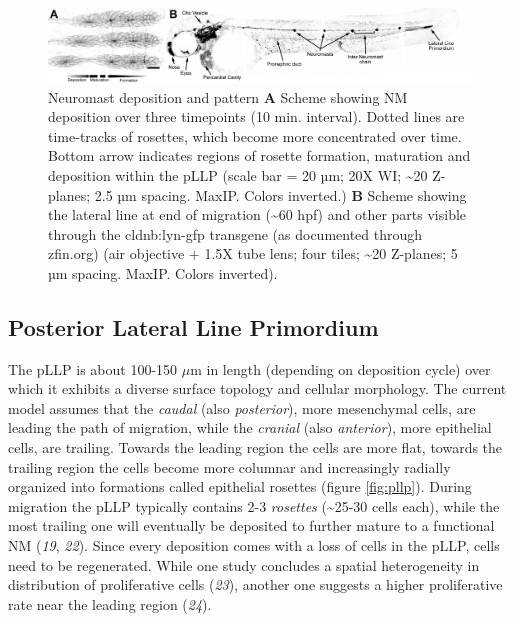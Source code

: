 \documentclass[11pt,singlespacinge,twoside]{reedthesis} %
\begin{document}
\begin{figure}

{\centering \includegraphics[width=.95\textwidth]{figures/intro/ll_gfp} 

}

\caption[Neuromast deposition and pattern]{Neuromast deposition and pattern \textbf{A} Scheme showing NM deposition over three timepoints (10 min. interval). Dotted lines are time-tracks of rosettes, which become more concentrated over time. Bottom arrow indicates regions of rosette formation, maturation and deposition within the pLLP (scale bar = 20 µm; 20X WI; \textasciitilde{}20 Z-planes; 2.5 µm spacing. MaxIP. Colors inverted.) \textbf{B} Scheme showing the lateral line at end of migration (\textasciitilde{}60 hpf) and other parts visible through the cldnb:lyn-gfp transgene (as documented through zfin.org) (air objective + 1.5X tube lens; four tiles; \textasciitilde{}20 Z-planes; 5 µm spacing. MaxIP. Colors inverted).}\label{fig:llgfp}
\end{figure}
\hypertarget{posterior-lateral-line-primordium}{%
\subsection{Posterior Lateral Line Primordium}\label{posterior-lateral-line-primordium}}

The pLLP is about 100-150 \(\mu\)m in length (depending on deposition cycle) over which it exhibits a diverse surface topology and cellular morphology. The current model assumes that the \emph{caudal} (also \emph{posterior}), more mesenchymal cells, are leading the path of migration, while the \emph{cranial} (also \emph{anterior}), more epithelial cells, are trailing. Towards the leading region the cells are more flat, towards the trailing region the cells become more columnar and increasingly radially organized into formations called epithelial rosettes (figure \ref{fig:pllp}). During migration the pLLP typically contains 2-3 \emph{rosettes} (\textasciitilde{}25-30 cells each), while the most trailing one will eventually be deposited to further mature to a functional NM (\emph{19}, \emph{22}). Since every deposition comes with a loss of cells in the pLLP, cells need to be regenerated. While one study concludes a spatial heterogeneity in distribution of proliferative cells (\emph{23}), another one suggests a higher proliferative rate near the leading region (\emph{24}).
\end{document}
